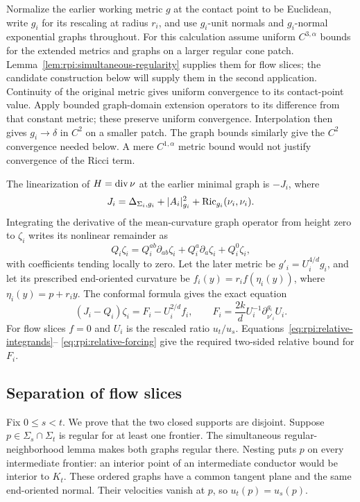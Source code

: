 Normalize the earlier working metric $g$ at the contact point to be Euclidean, write $g_i$
for its rescaling at radius $r_i$, and use $g_i$-unit normals and
$g_i$-normal exponential graphs throughout. For this calculation assume uniform $C^{3,\alpha}$ bounds for the
extended metrics and graphs on a larger regular cone patch.
Lemma~\ref{lem:rpi:simultaneous-regularity} supplies them for flow
slices; the candidate construction below will supply them in the
second application.
Continuity of the original metric gives uniform convergence to its
contact-point value. Apply bounded graph-domain extension operators
to its difference from that constant metric; these preserve uniform
convergence. Interpolation then gives $g_i\to\delta$ in $C^2$
on a smaller patch. The graph bounds similarly give the $C^2$
convergence needed below. A mere $C^{1,\alpha}$ metric bound would
not justify convergence of the Ricci term.

The linearization of $H=\operatorname{div}\nu$ at the earlier minimal graph is
$-J_i$, where
\[
 J_i=\Delta_{\Sigma_i,g_i}+|A_i|_{g_i}^2
                          +\operatorname{Ric}_{g_i}(\nu_i,\nu_i).
\]
Integrating the derivative of the mean-curvature graph operator from
height zero to $\zeta_i$ writes its nonlinear remainder as
\[
 Q_i\zeta_i
   =Q_i^{ab}\partial_{ab}\zeta_i
      +Q_i^a\partial_a\zeta_i+Q_i^0\zeta_i,
\]
with coefficients tending locally to zero. Let the later metric be
$g'_i=U_i^{4/d}g_i$, and let its prescribed end-oriented curvature
be $f_i(y)=r_i f(\eta_i(y))$, where $\eta_i(y)=p+r_i y$.
The conformal formula gives the exact equation
\begin{equation}\label{eq:rpi:separation-graph-equation}
 (J_i-Q_i)\zeta_i=F_i-U_i^{2/d}f_i,
 \qquad F_i=\frac{2k}{d}U_i^{-1}
                         \partial_{\nu'_i}^{g_i}U_i.
\end{equation}
For flow slices $f=0$ and $U_i$ is the rescaled ratio $u_t/u_s$.
Equations~\eqref{eq:rpi:relative-integrands}--
\eqref{eq:rpi:relative-forcing} give the required two-sided relative
bound for $F_i$.

\subsection{Separation of flow slices}
\label{sec:rpi:flow-slice-separation}

Fix $0\le s<t$. We prove that the two closed supports are disjoint.
Suppose $p\in\Sigma_s\cap\Sigma_t$ is regular
for at least one frontier. The simultaneous regular-neighborhood
lemma makes both graphs regular there. Nesting puts $p$ on every
intermediate frontier: an interior point of an intermediate conductor
would be interior to $K_t$. These ordered graphs have a common
tangent plane and the same end-oriented normal. Their velocities
vanish at $p$, so $u_t(p)=u_s(p)$.

